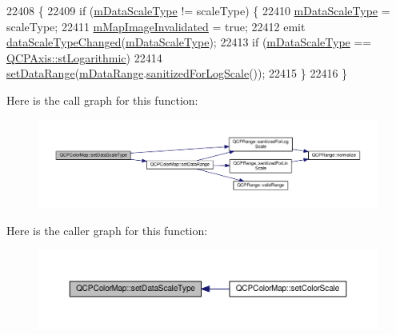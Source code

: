 \begin{DoxyCode}
22408                                                              \{
22409   \textcolor{keywordflow}{if} (\hyperlink{class_q_c_p_color_map_ab28a4b2def408f83b9818799d5f18446}{mDataScaleType} != scaleType) \{
22410     \hyperlink{class_q_c_p_color_map_ab28a4b2def408f83b9818799d5f18446}{mDataScaleType} = scaleType;
22411     \hyperlink{class_q_c_p_color_map_ac9aea6a5c193d7fa866bc7b26e79ef2c}{mMapImageInvalidated} = \textcolor{keyword}{true};
22412     emit \hyperlink{class_q_c_p_color_map_a978d5d5c9f68cffef8c902b855c04490}{dataScaleTypeChanged}(\hyperlink{class_q_c_p_color_map_ab28a4b2def408f83b9818799d5f18446}{mDataScaleType});
22413     \textcolor{keywordflow}{if} (\hyperlink{class_q_c_p_color_map_ab28a4b2def408f83b9818799d5f18446}{mDataScaleType} == \hyperlink{class_q_c_p_axis_a36d8e8658dbaa179bf2aeb973db2d6f0abf5b785ad976618816dc6f79b73216d4}{QCPAxis::stLogarithmic})
22414       \hyperlink{class_q_c_p_color_map_a980b42837821159786a85b4b7dcb8774}{setDataRange}(\hyperlink{class_q_c_p_color_map_ab87609621d16cd3e9d52ad070b327b08}{mDataRange}.\hyperlink{class_q_c_p_range_aaf6a9046e78d91eeb8e89584fe46b034}{sanitizedForLogScale}());
22415   \}
22416 \}
\end{DoxyCode}


Here is the call graph for this function\+:\nopagebreak
\begin{figure}[H]
\begin{center}
\leavevmode
\includegraphics[width=350pt]{class_q_c_p_color_map_a9d20aa08e3c1f20f22908c45b9c06511_cgraph}
\end{center}
\end{figure}




Here is the caller graph for this function\+:\nopagebreak
\begin{figure}[H]
\begin{center}
\leavevmode
\includegraphics[width=350pt]{class_q_c_p_color_map_a9d20aa08e3c1f20f22908c45b9c06511_icgraph}
\end{center}
\end{figure}


